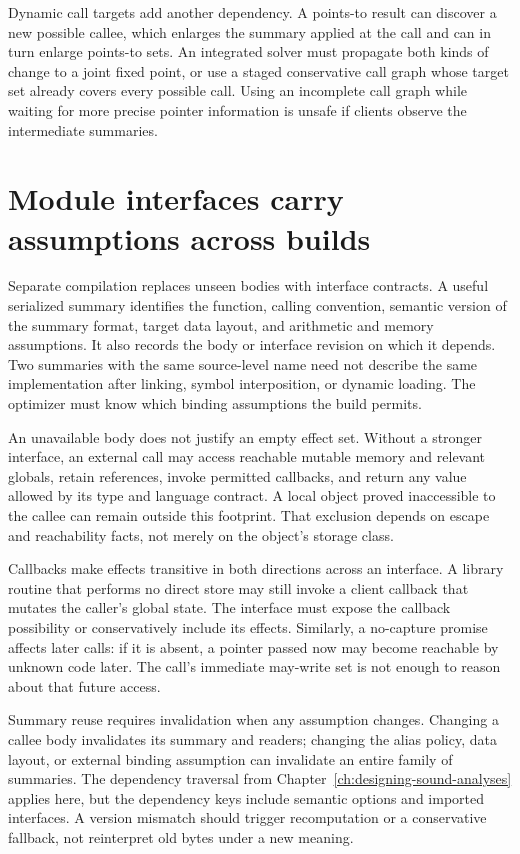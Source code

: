 Dynamic call targets add another dependency.
A points-to result can discover a new possible callee, which enlarges the summary applied at the call and can in turn enlarge points-to sets.
An integrated solver must propagate both kinds of change to a joint fixed point, or use a staged conservative call graph whose target set already covers every possible call.
Using an incomplete call graph while waiting for more precise pointer information is unsafe if clients observe the intermediate summaries.

\section{Module interfaces carry assumptions across builds}
\label{sec:ch44-modules}

Separate compilation replaces unseen bodies with interface contracts.
A useful serialized summary identifies the function, calling convention, semantic version of the summary format, target data layout, and arithmetic and memory assumptions.
It also records the body or interface revision on which it depends.
Two summaries with the same source-level name need not describe the same implementation after linking, symbol interposition, or dynamic loading.
The optimizer must know which binding assumptions the build permits.

An unavailable body does not justify an empty effect set.
Without a stronger interface, an external call may access reachable mutable memory and relevant globals, retain references, invoke permitted callbacks, and return any value allowed by its type and language contract.
A local object proved inaccessible to the callee can remain outside this footprint.
That exclusion depends on escape and reachability facts, not merely on the object's storage class.

Callbacks make effects transitive in both directions across an interface.
A library routine that performs no direct store may still invoke a client callback that mutates the caller's global state.
The interface must expose the callback possibility or conservatively include its effects.
Similarly, a no-capture promise affects later calls: if it is absent, a pointer passed now may become reachable by unknown code later.
The call's immediate may-write set is not enough to reason about that future access.

Summary reuse requires invalidation when any assumption changes.
Changing a callee body invalidates its summary and readers; changing the alias policy, data layout, or external binding assumption can invalidate an entire family of summaries.
The dependency traversal from Chapter~\ref{ch:designing-sound-analyses} applies here, but the dependency keys include semantic options and imported interfaces.
A version mismatch should trigger recomputation or a conservative fallback, not reinterpret old bytes under a new meaning.

